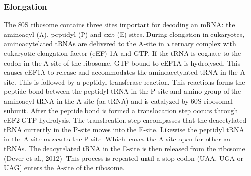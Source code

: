 \documentclass[12pt,openany]{book}
\begin{document}
\subsubsection{Elongation} \label{elongation}

The 80S ribosome contains three sites important for decoding an mRNA:
the aminoacyl (A), peptidyl (P) and exit (E) sites. During elongation in
eukaryotes, aminoacytelated tRNAs are delivered to the A-site in a
ternary complex with eukaryotic elongation factor (eEF) 1A and GTP. If
the tRNA is cognate to the codon in the A-site of the ribosome, GTP
bound to eEF1A is hydrolysed. This causes eEF1A to release and
accommodates the aminoacetylated tRNA in the A-site. This is followed by
a peptidyl transferase reaction. This reactions forms the peptide bond
between the peptidyl tRNA in the P-site and amino group of the
aminoacyl-tRNA in the A-site (aa-tRNA) and is catalyzed by 60S ribosomal
subunit. After the peptide bond is formed a translocation step occurs
through eEF2-GTP hydrolysis. The translocation step encompasses that the
deacetylated tRNA currently in the P-site moves into the E-site.
Likewise the peptidyl tRNA in the A-site moves to the P-site. Which
leaves the A-site open for other aa-tRNAs. The deacytelated tRNA in the
E-site is then released from the ribosome (Dever et al., 2012). This
process is repeated until a stop codon (UAA, UGA or UAG) enters the
A-site of the ribosome.
\end{document}
